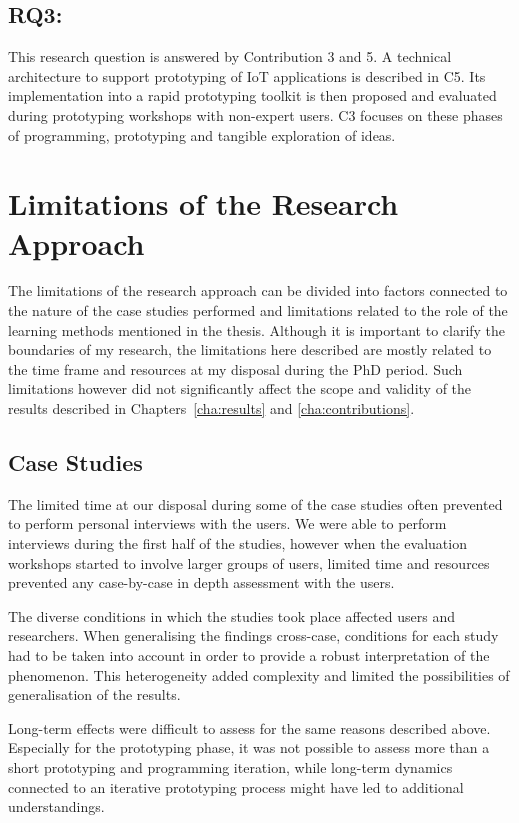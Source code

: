 \subsection*{RQ3: \RQiii}
\label{rq3}
This research question is answered by Contribution 3 and 5. A technical architecture to support prototyping of IoT applications is described in C5. Its implementation into a rapid prototyping toolkit is then proposed and evaluated during prototyping workshops with non-expert users. C3 focuses on these phases of programming, prototyping and tangible exploration of ideas.


\section{Limitations of the Research Approach}

The limitations of the research approach can be divided into factors connected to the nature of the case studies performed and limitations related to the role of the learning methods mentioned in the thesis. Although it is important to clarify the boundaries of my research, the limitations here described are mostly related to the time frame and resources at my disposal during the PhD period. Such limitations however did not significantly affect the scope and validity of the results described in Chapters~\ref{cha:results} and \ref{cha:contributions}.

\subsection{Case Studies}
The limited time at our disposal during some of the case studies often prevented to perform personal interviews with the users. We were able to perform interviews during the first half of the studies, however when the evaluation workshops started to involve larger groups of users, limited time and resources prevented any case-by-case in depth assessment with the users.

The diverse conditions in which the studies took place affected users and researchers. When generalising the findings cross-case, conditions for each study had to be taken into account in order to provide a robust interpretation of the phenomenon. This heterogeneity added complexity and limited the possibilities of generalisation of the results.

Long-term effects were difficult to assess for the same reasons described above. Especially for the prototyping phase, it was not possible to assess more than a short prototyping and programming iteration, while long-term dynamics connected to an iterative prototyping process might have led to additional understandings.

